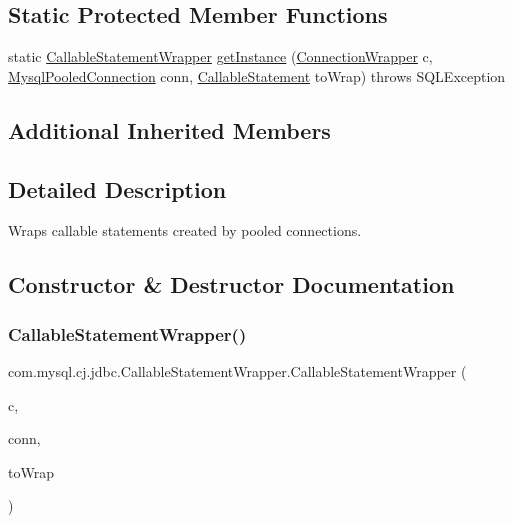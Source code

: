 \subsection*{Static Protected Member Functions}
\begin{DoxyCompactItemize}
\item 
static \mbox{\hyperlink{classcom_1_1mysql_1_1cj_1_1jdbc_1_1_callable_statement_wrapper}{Callable\+Statement\+Wrapper}} \mbox{\hyperlink{classcom_1_1mysql_1_1cj_1_1jdbc_1_1_callable_statement_wrapper_a7694068936a8af45dd84485c25548659}{get\+Instance}} (\mbox{\hyperlink{classcom_1_1mysql_1_1cj_1_1jdbc_1_1_connection_wrapper}{Connection\+Wrapper}} c, \mbox{\hyperlink{classcom_1_1mysql_1_1cj_1_1jdbc_1_1_mysql_pooled_connection}{Mysql\+Pooled\+Connection}} conn, \mbox{\hyperlink{classcom_1_1mysql_1_1cj_1_1jdbc_1_1_callable_statement}{Callable\+Statement}} to\+Wrap)  throws S\+Q\+L\+Exception 
\end{DoxyCompactItemize}
\subsection*{Additional Inherited Members}


\subsection{Detailed Description}
Wraps callable statements created by pooled connections. 

\subsection{Constructor \& Destructor Documentation}
\mbox{\label{classcom_1_1mysql_1_1cj_1_1jdbc_1_1_callable_statement_wrapper_a60a04ffa9e3517620a85c8c64169050f}} 
\subsubsection{\texorpdfstring{Callable\+Statement\+Wrapper()}{CallableStatementWrapper()}}
{\footnotesize\ttfamily com.\+mysql.\+cj.\+jdbc.\+Callable\+Statement\+Wrapper.\+Callable\+Statement\+Wrapper (\begin{DoxyParamCaption}\item[{\mbox{\hyperlink{classcom_1_1mysql_1_1cj_1_1jdbc_1_1_connection_wrapper}{Connection\+Wrapper}}}]{c,  }\item[{\mbox{\hyperlink{classcom_1_1mysql_1_1cj_1_1jdbc_1_1_mysql_pooled_connection}{Mysql\+Pooled\+Connection}}}]{conn,  }\item[{\mbox{\hyperlink{classcom_1_1mysql_1_1cj_1_1jdbc_1_1_callable_statement}{Callable\+Statement}}}]{to\+Wrap }\end{DoxyParamCaption})}


